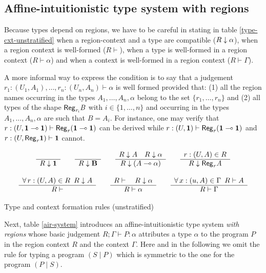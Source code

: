 \documentclass[11pt]{article}
\newcommand{\Gives}{\vdash}             \newcommand{\IGives}{\vdash_{I}}        \newcommand{\AIGives}{\vdash_{{\it AI}}} \newcommand{\CGives}{\vdash_{C}}
\newcommand{\hyp}[3]{#1:(#2, #3)}
\newcommand{\behtype}{{\bf B}}
\newcommand{\infer}[2]{\begin{array}{c} #1 \\ \hline #2 \end{array}}
\newcommand{\qqs}[2]{\forall\, #1\;\: #2}
\newcommand{\set}[1]{\{#1\}}
\newcommand{\rgtype}[2]{{\it {\sf Reg}_{#1} #2}}
\begin{document}
\subsection{Affine-intuitionistic type system with regions}
Because types depend on regions, we have to be careful in stating in 
table \ref{type-cxt-unstratified}
when a region-context and a type are compatible ($R\downarrow \alpha$),
when a region context is well-formed ($R\Gives$), 
when a type is well-formed in a region context ($R\Gives \alpha$) 
and when a context is well-formed in a region context ($R\Gives \Gamma$).

A more informal way to express the condition is to say that a
judgement $\hyp{r_{1}}{U_{1}}{A_{1}},\ldots,\hyp{r_{n}}{U_{n}}{A_{n}}
\Gives \alpha$ is well formed provided that: (1) all the region names
occurring in the types $A_1,\ldots,A_n,\alpha$ belong to the set
$\set{r_1,\ldots,r_n}$ and (2) all types of the shape
$\rgtype{r_{i}}{B}$ with $i\in \set{1,\ldots,n}$ and occurring in the
types $A_1,\ldots,A_n,\alpha$ are such that $B=A_i$.
For instance, one may verify that $\hyp{r}{U}{\tertype \limp \tertype}
\Gives \rgtype{r}{(\tertype \limp \tertype)}$ can be derived while
$\hyp{r}{U}{\tertype} \Gives \rgtype{r}{(\tertype \limp \tertype)}$ and
$\hyp{r}{U}{\rgtype{r}{\tertype}} \Gives \tertype$ cannot.



\begin{table}
{\footnotesize
\[
\begin{array}{c}

\infer{}
{R\dcl \tertype}
\qquad

\infer{}
{R\dcl \behtype}
\qquad

\infer{R\dcl A\quad R\dcl \alpha}
{R\dcl (A\limp \alpha)}

\qquad

\infer{\hyp{r}{U}{A}\in R}
{R\dcl \rgtype{r}{A}} \\ \\ 

\infer{\qqs{\hyp{r}{U}{A} \in R}{R\dcl A}}
{R\Gives}

\qquad

\infer{R\Gives\quad R\dcl \alpha}
{R\Gives \alpha} 

\qquad

\infer{\qqs{\hyp{x}{u}{A}\in \Gamma}{R\Gives A}}
{R\Gives \Gamma} 

\end{array}
\]}
\caption{Type and context formation rules (unstratified)}\label{type-cxt-unstratified}
\end{table}
Next, table \ref{air-system} introduces an affine-intuitionistic type system 
{\em with regions} whose basic judgement
$R;\Gamma \Gives P:\alpha$ attributes a type $\alpha$ to the program $P$
in the region context $R$ and the context $\Gamma$.
Here and in the following we omit the rule for typing a program
$(S\mid P)$ which is symmetric to the one for the program $(P\mid S)$.
\end{document}
